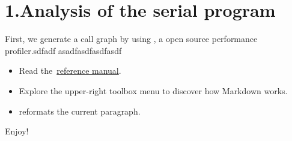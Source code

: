 \documentclass{article}
\begin{document}
\mdxtitleblockstart{}
\mdxauthorstart{}
\mdxauthorend\mdtitleauthorrunning{}{}\mdxtitleblockend%

\section{1.\hspace*{0.5em}Analysis of the serial program}\label{sec-analysis-of-the-serial-program}%

\noindent{}First, we generate a call graph by using , a open source performance profiler.sdfadf asadfasdfasdfasdf%

\begin{itemize}[noitemsep,topsep=\mdcompacttopsep]%

\item{}Read the~\href{http://research.microsoft.com/en-us/um/people/daan/madoko/doc/reference.html}{reference manual}.%

\item{}Explore the upper-right toolbox menu to discover how Markdown works.%

\item{} reformats the current paragraph.%
\end{itemize}%

\noindent{}Enjoy!%
\end{document}
